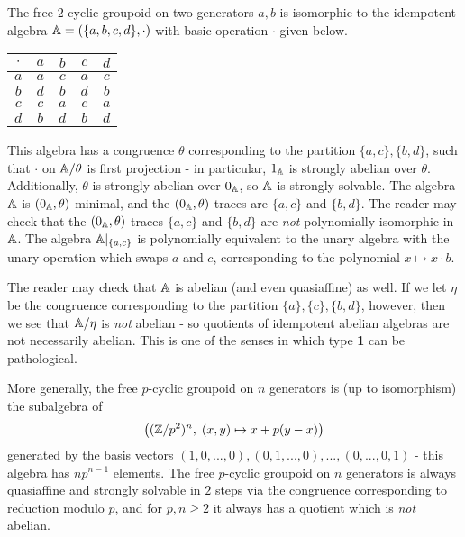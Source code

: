 \begin{appendices}
\begin{ex}
The free $2$-cyclic groupoid on two generators $a,b$ is isomorphic to the idempotent algebra $\mathbb{A} = (\{a,b,c,d\}, \cdot)$ with basic operation $\cdot$ given below.
\begin{center}
\begin{tabular}{c | c c c c} $\cdot$ & $a$ & $b$ & $c$ & $d$\\ \hline $a$ & $a$ & $c$ & $a$ & $c$\\ $b$ & $d$ & $b$ & $d$ & $b$\\ $c$ & $c$ & $a$ & $c$ & $a$\\ $d$ & $b$ & $d$ & $b$ & $d$ \end{tabular}
\end{center}
This algebra has a congruence $\theta$ corresponding to the partition $\{a,c\}, \{b,d\}$, such that $\cdot$ on $\mathbb{A}/\theta$ is first projection - in particular, $1_{\mathbb{A}}$ is strongly abelian over $\theta$. Additionally, $\theta$ is strongly abelian over $0_{\mathbb{A}}$, so $\mathbb{A}$ is strongly solvable. The algebra $\mathbb{A}$ is $(0_{\mathbb{A}},\theta)$-minimal, and the $(0_{\mathbb{A}},\theta)$-traces are $\{a,c\}$ and $\{b,d\}$. The reader may check that the $(0_{\mathbb{A}},\theta)$-traces $\{a,c\}$ and $\{b,d\}$ are \emph{not} polynomially isomorphic in $\mathbb{A}$. The algebra $\mathbb{A}|_{\{a,c\}}$ is polynomially equivalent to the unary algebra with the unary operation which swaps $a$ and $c$, corresponding to the polynomial $x \mapsto x\cdot b$.

The reader may check that $\mathbb{A}$ is abelian (and even quasiaffine) as well. If we let $\eta$ be the congruence corresponding to the partition $\{a\}, \{c\}, \{b,d\}$, however, then we see that $\mathbb{A}/\eta$ is \emph{not} abelian - so quotients of idempotent abelian algebras are not necessarily abelian. This is one of the senses in which type \textbf{1} can be pathological.

More generally, the free $p$-cyclic groupoid on $n$ generators is (up to isomorphism) the subalgebra of
\[
\big((\mathbb{Z}/p^2)^n,\; (x,y) \mapsto x + p(y-x)\big)
\]
generated by the basis vectors $(1,0,...,0), (0,1,...,0), ..., (0,...,0,1)$ - this algebra has $np^{n-1}$ elements. The free $p$-cyclic groupoid on $n$ generators is always quasiaffine and strongly solvable in $2$ steps via the congruence corresponding to reduction modulo $p$, and for $p,n \ge 2$ it always has a quotient which is \emph{not} abelian.
\end{ex}





\end{appendices}
